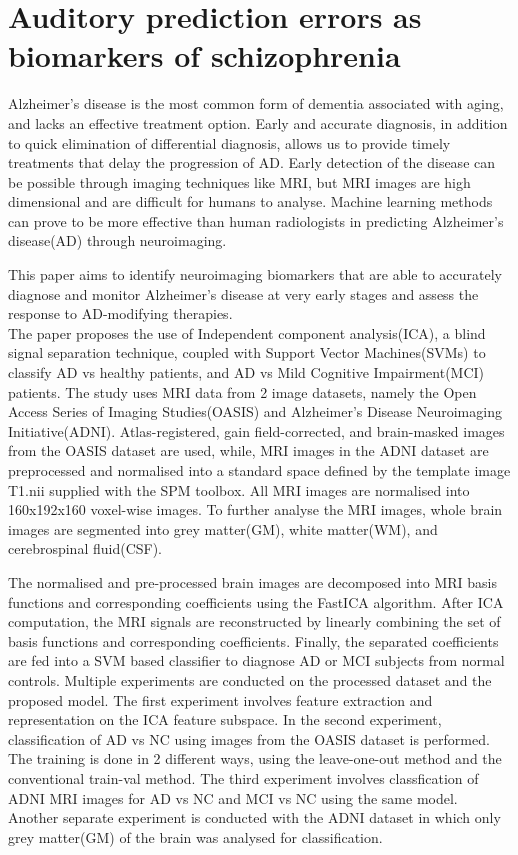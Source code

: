 \documentclass[11pt]{article}
\begin{document}
  \section*{Auditory prediction errors as biomarkers of schizophrenia}
  Alzheimer’s disease is the most common form of dementia associated with aging, and lacks an effective treatment option. Early and accurate diagnosis, in addition to quick elimination of differential diagnosis, allows us to provide timely treatments that delay the progression of AD. Early detection of the disease can be possible through imaging techniques like MRI, but MRI images are high dimensional and are difficult for humans to analyse. Machine learning methods can prove to be more effective than human radiologists in predicting Alzheimer’s disease(AD) through neuroimaging.

  This paper aims to identify neuroimaging biomarkers that are able to accurately diagnose and monitor Alzheimer’s disease at very early stages and assess the response to AD-modifying therapies.\\

  The paper proposes the use of Independent component analysis(ICA), a blind signal separation technique, coupled with Support Vector Machines(SVMs) to classify AD vs healthy patients, and AD vs Mild Cognitive Impairment(MCI) patients.
  The study uses MRI data from 2 image datasets, namely the Open Access Series of Imaging Studies(OASIS) and Alzheimer’s Disease Neuroimaging Initiative(ADNI).
  Atlas-registered, gain field-corrected, and brain-masked images from the OASIS dataset are used, while,
  MRI images in the ADNI dataset are preprocessed and normalised into a standard space defined by the template image T1.nii supplied with the SPM toolbox.
  All MRI images are normalised into 160x192x160 voxel-wise images.
  To further analyse the MRI images, whole brain images are segmented into grey matter(GM), white matter(WM), and cerebrospinal fluid(CSF).

  The normalised and pre-processed brain images are decomposed into MRI basis functions and corresponding coefficients using the FastICA algorithm. 
  After ICA computation, the MRI signals are reconstructed by linearly combining the set of basis functions and corresponding coefficients.
  Finally, the separated coefficients are fed into a SVM based classifier to diagnose AD or MCI subjects from normal controls.
  Multiple experiments are conducted on the processed dataset and the proposed model.
  The first experiment involves feature extraction and representation on the ICA feature subspace.
  In the second experiment, classification of AD vs NC using images from the OASIS dataset is performed. The training is done in 2 different ways, using the leave-one-out method and the conventional train-val method.
  The third experiment involves classfication of ADNI MRI images for AD vs NC and MCI vs NC using the same model.
  Another separate experiment is conducted with the ADNI dataset in which only grey matter(GM) of the brain was analysed for classification.\\
\end{document}
